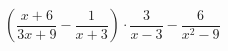 \begin{ex}[type=expression]
	\begin{condition}
		\(\left( \dfrac{x+6}{3x+9}-\dfrac{1}{x+3} \right)\cdot\dfrac{3}{x-3}-\dfrac{6}{x^2-9}\)
	\end{condition}
\end{ex}